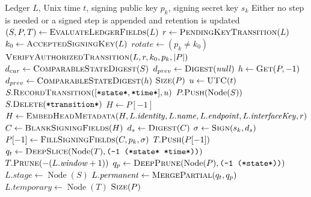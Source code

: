 \begin{algorithm}[htbp]
\caption{Commit Journal Step}
\label{alg:commit-step}
\footnotesize
\begin{algorithmic}[1]
\Require Ledger $L$, Unix time $t$, signing public key $p_k$, signing secret key $s_k$
\Ensure Either no step is needed or a signed step is appended and retention is updated
  \Statex {}
  \State $(S,P,T) \gets \Call{EvaluateLedgerFields}{L}$
  \State $r \gets \Call{PendingKeyTransition}{L}$
  \State $k_0 \gets \Call{AcceptedSigningKey}{L}$
  \State $\mathit{rotate} \gets (p_k \ne k_0)$
    \State $\Call{VerifyAuthorizedTransition}{L,r,k_0,p_k,\lvert P\rvert}$
    \State {}
  \EndIf
  \State $d_{cur} \gets \Call{ComparableStateDigest}{S}$
    \State $d_{prev} \gets \Call{Digest}{\mathit{null}}$
  \Else
    \State $h \gets \Call{Get}{P,-1}$
    \State $d_{prev} \gets \Call{ComparableStateDigest}{h}$
  \EndIf
    \State \Return $\Call{Size}{P}$
  \EndIf
  \State $u \gets \Call{UTC}{t}$
  \State $S.\Call{RecordTransition}{[\texttt{*state*},\texttt{*time*}],u}$
  \State $P.\Call{Push}{\operatorname{Node}(S)}$
  \State $S.\Call{Delete}{\texttt{*transition*}}$
  \State $H \gets P[-1]$
  \State $H \gets \Call{EmbedHeadMetadata}{H,L.\mathit{identity},L.\mathit{name},L.\mathit{endpoint},L.\mathit{interfaceKey},r}$
  \State $C \gets \Call{BlankSigningFields}{H}$ 
  \State $d_s \gets \Call{Digest}{C}$
  \State $\sigma \gets \Call{Sign}{s_k,d_s}$
  \State $P[-1] \gets \Call{FillSigningFields}{C,p_k,\sigma}$
    \State {}
  \EndIf
  \State $T.\Call{Push}{P[-1]}$
  \State $q_t \gets \Call{DeepSlice}{\operatorname{Node}(T),\texttt{(-1 (*state* *time*))}}$
    \State $T.\Call{Prune}{-(L.\mathit{window}+1)}$
  \EndIf
  \State $q_p \gets \Call{DeepPrune}{\operatorname{Node}(P),\texttt{(-1 (*state*))}}$
  \State $L.\mathit{stage} \gets \operatorname{Node}(S)$
  \State $L.\mathit{permanent} \gets \Call{MergePartial}{q_t,q_p}$
  \State $L.\mathit{temporary} \gets \operatorname{Node}(T)$
  \State \Return $\Call{Size}{P}$
\EndFunction
\end{algorithmic}
\end{algorithm}
